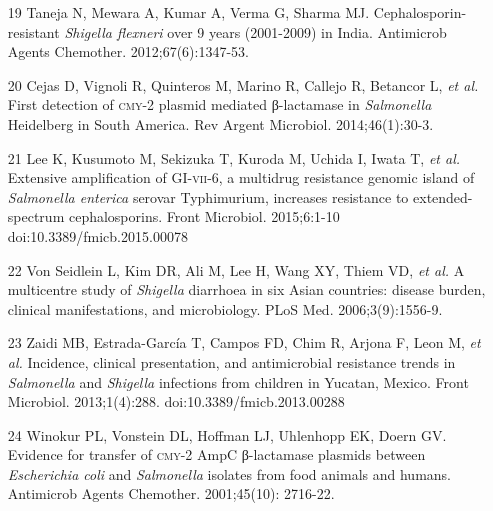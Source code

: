 \documentclass{article}
\begin{document}
\begin{itemize}
\item[19] Taneja N, Mewara A, Kumar A, Verma G, Sharma MJ.
Cephalosporin-resistant \textit{Shigella flexneri}
over 9 years (2001-2009) in India. Antimicrob Agents Chemother.
2012;67(6):1347-53.

\item[20] Cejas D, Vignoli R, Quinteros M, Marino R, Callejo R, Betancor L,
\textit{et al.}
First detection of \textsc{cmy}-2 plasmid mediated β-lactamase in \textit{Salmonella}
Heidelberg in South America. Rev Argent Microbiol. 2014;46(1):30-3.

\item[21] Lee K, Kusumoto M, Sekizuka T, Kuroda M, Uchida I, Iwata T,
\textit{et al.}
Extensive amplification of GI-\textsc{vii}-6, a multidrug resistance genomic island of
\textit{Salmonella enterica}
serovar Typhimurium, increases resistance to extended-spectrum cephalosporins.
Front Microbiol. 2015;6:1-10 doi:10.3389/fmicb.2015.00078

\item[22] Von Seidlein L, Kim DR, Ali M, Lee H, Wang XY, Thiem VD, \textit{et
al.}
A multicentre study of \textit{Shigella}
diarrhoea in six Asian countries: disease burden, clinical manifestations, and
microbiology. PLoS Med. 2006;3(9):1556-9.

\item[23] Zaidi MB, Estrada-García T, Campos FD, Chim R, Arjona F, Leon M,
\textit{et al.}
Incidence, clinical presentation, and antimicrobial resistance trends in
\textit{Salmonella}
and \textit{Shigella}
infections from children in Yucatan, Mexico. Front Microbiol. 2013;1(4):288.
doi:10.3389/fmicb.2013.00288

\item[24] Winokur PL, Vonstein DL, Hoffman LJ, Uhlenhopp EK, Doern GV.
Evidence for transfer of \textsc{cmy}-2 AmpC β-lactamase plasmids between
\textit{Escherichia coli}
and \textit{Salmonella}
isolates from food animals and humans. Antimicrob Agents Chemother. 2001;45(10):
2716-22.

\end{itemize}
\end{document}
